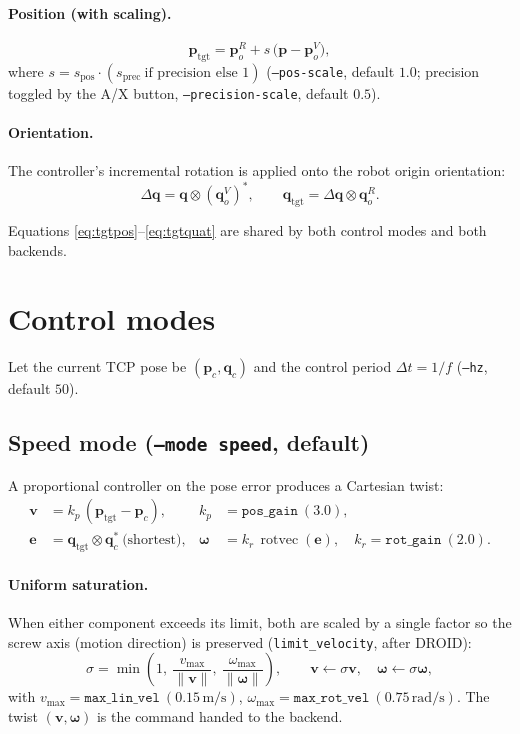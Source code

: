 \documentclass[11pt]{article}
\newcommand{\quat}[1]{\bm{#1}}
\newcommand{\vp}{\bm{p}}
\newcommand{\vv}{\bm{v}}
\newcommand{\vw}{\bm{\omega}}
\DeclareMathOperator{\rotvec}{rotvec}
\begin{document}
\paragraph{Position (with scaling).}
\begin{equation}
  \vp_{\text{tgt}} = \vp_{o}^{R} + s\,\big(\vp - \vp_{o}^{V}\big),
  \label{eq:tgtpos}
\end{equation}
where $s = s_{\text{pos}}\cdot(s_{\text{prec}}\ \text{if precision else }1)$
(\texttt{--pos-scale}, default $1.0$; precision toggled by the A/X button,
\texttt{--precision-scale}, default $0.5$).

\paragraph{Orientation.} The controller's incremental rotation is applied onto
the robot origin orientation:
\begin{equation}
  \Delta\quat{q} = \quat{q} \otimes (\quat{q}_{o}^{V})^{*},\qquad
  \quat{q}_{\text{tgt}} = \Delta\quat{q} \otimes \quat{q}_{o}^{R}.
  \label{eq:tgtquat}
\end{equation}

Equations \eqref{eq:tgtpos}--\eqref{eq:tgtquat} are shared by both control
modes and both backends.

\section{Control modes}
Let the current TCP pose be $(\vp_{c},\quat{q}_{c})$ and the control period
$\Delta t = 1/f$ (\texttt{--hz}, default $50$).

\subsection{Speed mode (\texttt{--mode speed}, default)}
A proportional controller on the pose error produces a Cartesian twist:
\begin{align}
  \vv &= k_p\,(\vp_{\text{tgt}} - \vp_{c}), &
  k_p &= \texttt{pos\_gain}\ (3.0),\\
  \quat{e} &= \quat{q}_{\text{tgt}}\otimes\quat{q}_{c}^{*}\ \text{(shortest)}, &
  \vw &= k_r\,\rotvec(\quat{e}), \quad k_r=\texttt{rot\_gain}\ (2.0).
\end{align}

\paragraph{Uniform saturation.} When either component exceeds its limit, both
are scaled by a single factor so the screw axis (motion direction) is
preserved (\texttt{limit\_velocity}, after DROID):
\begin{equation}
  \sigma = \min\!\left(1,\ \frac{v_{\max}}{\lVert\vv\rVert},\
                       \frac{\omega_{\max}}{\lVert\vw\rVert}\right),\qquad
  \vv\leftarrow\sigma\vv,\quad \vw\leftarrow\sigma\vw,
\end{equation}
with $v_{\max}=\texttt{max\_lin\_vel}\ (0.15\,\mathrm{m/s})$,
$\omega_{\max}=\texttt{max\_rot\_vel}\ (0.75\,\mathrm{rad/s})$. The twist
$(\vv,\vw)$ is the command handed to the backend.
\end{document}
